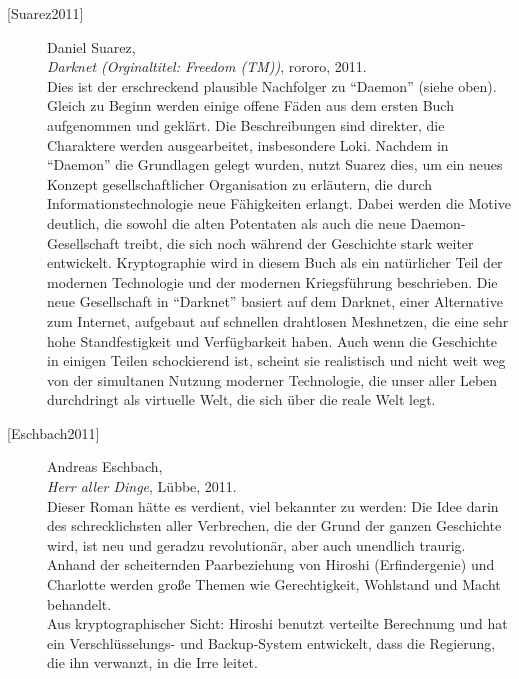 \begin{refsegment}
\begin{description}
\item[\textrm{[Suarez2011]}] 
    Daniel Suarez, \\
    {\em Darknet (Orginaltitel: Freedom (TM))}, rororo, 2011. \\
    Dies ist der erschreckend plausible Nachfolger zu "`Daemon"' (siehe oben).
    Gleich zu Beginn werden einige offene Fäden aus dem ersten Buch aufgenommen und
    geklärt. Die Beschreibungen sind direkter, die Charaktere werden ausgearbeitet,
    insbesondere Loki. Nachdem in "`Daemon"' die Grundlagen gelegt wurden, nutzt Suarez
    dies, um ein neues Konzept gesellschaftlicher Organisation zu erläutern, die
    durch Informationstechnologie neue Fähigkeiten erlangt. Dabei werden die Motive
    deutlich, die sowohl die alten Potentaten als auch die neue Daemon-Gesellschaft
    treibt, die sich noch während der Geschichte stark weiter entwickelt.
    Kryptographie wird in diesem Buch als ein natürlicher Teil der modernen Technologie
    und der modernen Kriegsführung beschrieben.
    Die neue Gesellschaft in "`Darknet"' basiert auf dem Darknet,
    einer Alternative zum Internet, aufgebaut auf schnellen drahtlosen Meshnetzen, die
    eine sehr hohe Standfestigkeit und Verfügbarkeit haben. Auch wenn die Geschichte
    in einigen Teilen schockierend ist, scheint sie realistisch und nicht weit weg
    von der simultanen Nutzung moderner Technologie, die unser aller Leben durchdringt
    als virtuelle Welt, die sich über die reale Welt legt.\\



\item[\textrm{[Eschbach2011]}] 
    Andreas Eschbach, \\
    {\em Herr aller Dinge}, Lübbe, 2011. \\
    Dieser Roman hätte es verdient, viel bekannter zu werden: Die Idee darin des
    \glqq schrecklichsten aller Verbrechen\grqq, die der Grund der ganzen Geschichte
    wird, ist neu und geradzu revolutionär, aber auch unendlich traurig.
    Anhand der scheiternden Paarbeziehung von Hiroshi (Erfindergenie) und Charlotte
    werden große Themen wie Gerechtigkeit, Wohlstand und Macht behandelt.\\
    Aus kryptographischer Sicht: Hiroshi benutzt verteilte Berechnung und hat
    ein Verschlüs\-se\-lungs- und Backup-System entwickelt, dass die Regierung,
    die ihn verwanzt, in die Irre leitet.\\




\end{description}
\end{refsegment}
